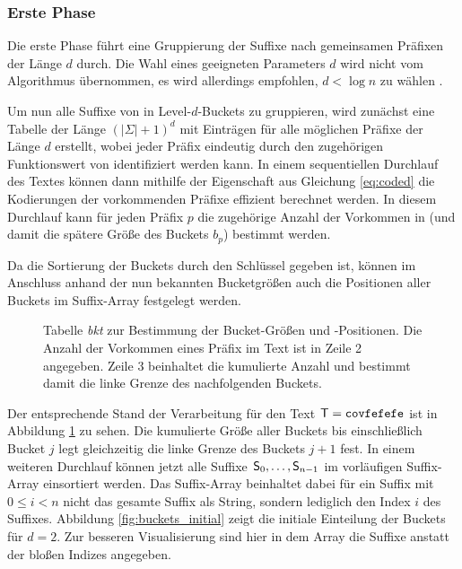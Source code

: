 \subsubsection{Erste Phase}
\label{bpr:algorithmus:phase1}

Die erste Phase führt eine Gruppierung der Suffixe nach gemeinsamen Präfixen der Länge \(d\) durch. Die Wahl eines geeigneten Parameters \(d\) wird nicht vom Algorithmus übernommen, es wird allerdings empfohlen, \(d < \log n\) zu wählen \cite{saca:2}.\par
Um nun alle Suffixe von  in Level-\(d\)-Buckets zu gruppieren, wird zunächst eine Tabelle \bkt der Länge \((|\Sigma| + 1)^d\) mit Einträgen für alle möglichen Präfixe der Länge \(d\) erstellt, wobei jeder Präfix eindeutig durch den zugehörigen Funktionswert von \coded identifiziert werden kann. In einem sequentiellen Durchlauf des Textes  können dann mithilfe der Eigenschaft aus Gleichung \ref{eq:coded} die Kodierungen der vorkommenden Präfixe effizient berechnet werden. In diesem Durchlauf kann für jeden Präfix \(p\) die zugehörige Anzahl der Vorkommen in  (und damit die spätere Größe des Buckets \(b_p\)) bestimmt werden.\par
Da die Sortierung der Buckets durch den Schlüssel \coded gegeben ist, können im Anschluss anhand der nun bekannten Bucketgrößen auch die Positionen aller Buckets im Suffix-Array festgelegt werden.
\begin{figure}[ht]
	\vspace{0.2\baselineskip}
	\caption[Tabelle \emph{bkt} zur Bestimmung der Bucket-Größen und -Positionen]{Tabelle \emph{bkt} zur Bestimmung der Bucket-Größen und -Positionen. Die Anzahl der Vorkommen eines Präfix im Text ist in Zeile 2 angegeben. Zeile 3 beinhaltet die kumulierte Anzahl und bestimmt damit die linke Grenze des nachfolgenden Buckets.}
	\label{fig:bkt}
\end{figure}
Der entsprechende Stand der Verarbeitung für den Text \(\inputtext = \covfefefe\) ist in Abbildung \ref{fig:bkt} zu sehen. Die kumulierte Größe aller Buckets bis einschließlich Bucket \(j\) legt gleichzeitig die linke Grenze des Buckets \(j+1\) fest. In einem weiteren Durchlauf können jetzt alle Suffixe \(\mathsf{S}_{0}, \ldots, \mathsf{S}_{n-1}\) im vorläufigen Suffix-Array \sa einsortiert werden. Das Suffix-Array beinhaltet dabei für ein Suffix  mit \(0 \leq i < n\) nicht das gesamte Suffix als String, sondern lediglich den Index \(i\) des Suffixes. Abbildung \ref{fig:buckets_initial} zeigt die initiale Einteilung der Buckets für \(d=2\). Zur besseren Visualisierung sind hier in dem Array die Suffixe anstatt der bloßen Indizes angegeben.\par\smallskip
